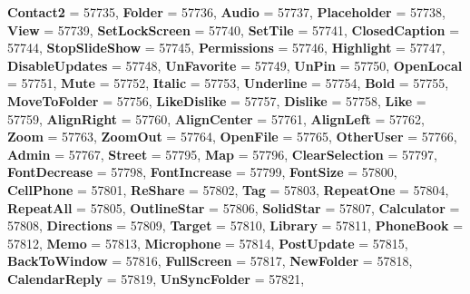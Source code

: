 \begin{DoxyCompactItemize}
\newline
{\bfseries Contact2} = 57735, 
{\bfseries Folder} = 57736, 
{\bfseries Audio} = 57737, 
{\bfseries Placeholder} = 57738, 
\newline
{\bfseries View} = 57739, 
{\bfseries Set\+Lock\+Screen} = 57740, 
{\bfseries Set\+Tile} = 57741, 
{\bfseries Closed\+Caption} = 57744, 
\newline
{\bfseries Stop\+Slide\+Show} = 57745, 
{\bfseries Permissions} = 57746, 
{\bfseries Highlight} = 57747, 
{\bfseries Disable\+Updates} = 57748, 
\newline
{\bfseries Un\+Favorite} = 57749, 
{\bfseries Un\+Pin} = 57750, 
{\bfseries Open\+Local} = 57751, 
{\bfseries Mute} = 57752, 
\newline
{\bfseries Italic} = 57753, 
{\bfseries Underline} = 57754, 
{\bfseries Bold} = 57755, 
{\bfseries Move\+To\+Folder} = 57756, 
\newline
{\bfseries Like\+Dislike} = 57757, 
{\bfseries Dislike} = 57758, 
{\bfseries Like} = 57759, 
{\bfseries Align\+Right} = 57760, 
\newline
{\bfseries Align\+Center} = 57761, 
{\bfseries Align\+Left} = 57762, 
{\bfseries Zoom} = 57763, 
{\bfseries Zoom\+Out} = 57764, 
\newline
{\bfseries Open\+File} = 57765, 
{\bfseries Other\+User} = 57766, 
{\bfseries Admin} = 57767, 
{\bfseries Street} = 57795, 
\newline
{\bfseries Map} = 57796, 
{\bfseries Clear\+Selection} = 57797, 
{\bfseries Font\+Decrease} = 57798, 
{\bfseries Font\+Increase} = 57799, 
\newline
{\bfseries Font\+Size} = 57800, 
{\bfseries Cell\+Phone} = 57801, 
{\bfseries Re\+Share} = 57802, 
{\bfseries Tag} = 57803, 
\newline
{\bfseries Repeat\+One} = 57804, 
{\bfseries Repeat\+All} = 57805, 
{\bfseries Outline\+Star} = 57806, 
{\bfseries Solid\+Star} = 57807, 
\newline
{\bfseries Calculator} = 57808, 
{\bfseries Directions} = 57809, 
{\bfseries Target} = 57810, 
{\bfseries Library} = 57811, 
\newline
{\bfseries Phone\+Book} = 57812, 
{\bfseries Memo} = 57813, 
{\bfseries Microphone} = 57814, 
{\bfseries Post\+Update} = 57815, 
\newline
{\bfseries Back\+To\+Window} = 57816, 
{\bfseries Full\+Screen} = 57817, 
{\bfseries New\+Folder} = 57818, 
{\bfseries Calendar\+Reply} = 57819, 
\newline
{\bfseries Un\+Sync\+Folder} = 57821, 

\end{DoxyCompactItemize}
